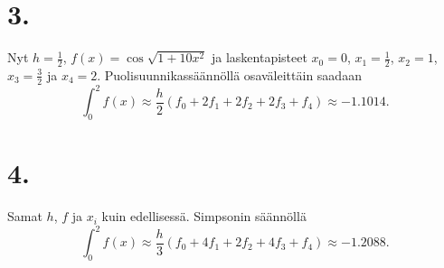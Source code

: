 \documentclass{article}
\begin{document}
\section*{3.}

Nyt $h = \frac{1}{2}$, $f(x) = \cos\sqrt{1+10x^2}$ ja laskentapisteet
$x_0 = 0$, $x_1 = \frac{1}{2}$, $x_2 = 1$, $x_3 = \frac{3}{2}$ ja $x_4 = 2$.
Puolisuunnikassäännöllä osaväleittäin saadaan
\[
  \int_0^2 f(x) \approx \frac{h}{2}(f_0 + 2f_1 + 2f_2 + 2f_3 + f_4)
  \approx -1.1014.
\]


\section*{4.}

Samat $h$, $f$ ja $x_i$ kuin edellisessä.
Simpsonin säännöllä
\[
  \int_0^2 f(x) \approx \frac{h}{3}(f_0 + 4f_1 + 2f_2 + 4f_3 + f_4)
  \approx -1.2088.
\]
\end{document}
